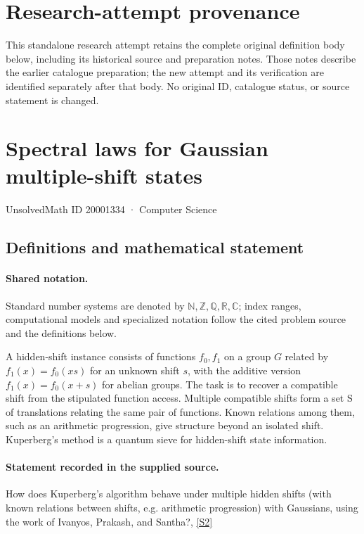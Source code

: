 \documentclass[11pt]{article}
\begin{document}
\section*{Research-attempt provenance}
This standalone research attempt retains the complete original definition body below,
including its historical source and preparation notes. Those notes describe the
earlier catalogue preparation; the new attempt and its verification are identified
separately after that body. No original ID, catalogue status, or source statement is changed.

\section{Spectral laws for Gaussian multiple-shift states}\label{20001334}
{\small UnsolvedMath ID 20001334 · Computer Science}
\subsection{Definitions and mathematical statement}

\paragraph{Shared notation.}Standard number systems are denoted by $\mathbb N,\mathbb Z,\mathbb Q,\mathbb R,\mathbb C$; index ranges, computational models and specialized notation follow the cited problem source and the definitions below.


A hidden-shift instance consists of functions $f_0,f_1$ on a group $G$ related by $f_1(x)=f_0(xs)$ for an unknown shift $s$, with the additive version $f_1(x)=f_0(x+s)$ for abelian groups. The task is to recover a compatible shift from the stipulated function access. Multiple compatible shifts form a set S of translations relating the same pair of functions. Known relations among them, such as an arithmetic progression, give structure beyond an isolated shift. Kuperberg's method is a quantum sieve for hidden-shift state information.
\paragraph{Statement recorded in the supplied source.}
How does Kuperberg's algorithm behave under multiple hidden shifts (with known relations between shifts, e.g. arithmetic progression) with Gaussians, using the work of Ivanyos, Prakash, and Santha?, \href{http://aimpl.org/quantumalg/4/}{[S2]}
\end{document}
